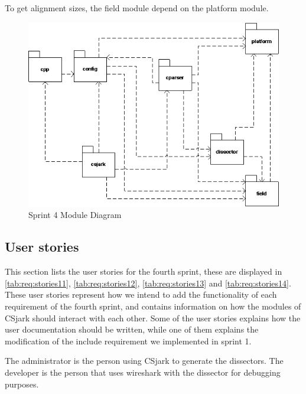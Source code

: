 To get alignment sizes, the field module depend on the platform module.

\begin{figure}[htbp]
	\center
	\includegraphics[width=\textwidth]{./sprints/img/sp4modulediagram.png}
	\caption{Sprint 4 Module Diagram \label{fig:sp4module}}
\end{figure}

\subsection{User stories}
\label{sec:req:stories4}
This section lists the user stories for the fourth sprint, these are displayed in \autoref{tab:req:stories11}, \autoref{tab:req:stories12}, \autoref{tab:req:stories13} and \autoref{tab:req:stories14}.
These user stories represent how we intend to add the functionality of each requirement of the fourth sprint,
and contains information on how the modules of CSjark should interact with each other.
Some of the user stories explains how the user documentation should be written, while one of them explains the modification of the \gls{include} requirement we implemented in sprint 1.

The administrator is the person using CSjark to generate the \glspl{dissector}. 
The developer is the person that uses \Gls{wireshark} with the \gls{dissector} for debugging purposes.

